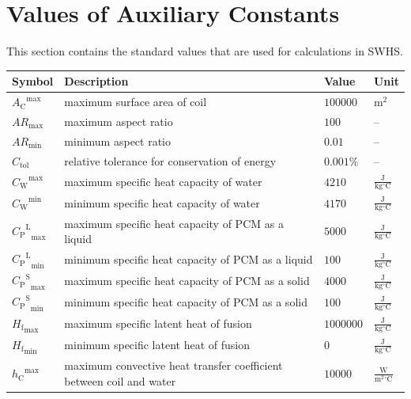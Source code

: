 \documentclass[12pt]{article}
\begin{document}
\section{Values of Auxiliary Constants}
\label{Sec:AuxConstants}
This section contains the standard values that are used for calculations in SWHS.

\begin{longtabu}{l X[l] l l}
\toprule
\textbf{Symbol} & \textbf{Description} & \textbf{Value} & \textbf{Unit}
\\
\midrule
\endhead
${{A_{\text{C}}}^{\text{max}}}$ & maximum surface area of coil & $100000$ & ${\text{m}^{2}}$
\\
${AR_{\text{max}}}$ & maximum aspect ratio & $100$ & --
\\
${AR_{\text{min}}}$ & minimum aspect ratio & $0.01$ & --
\\
${C_{\text{tol}}}$ & relative tolerance for conservation of energy & $0.001\%$ & --
\\
${{C_{\text{W}}}^{\text{max}}}$ & maximum specific heat capacity of water & $4210$ & $\frac{\text{J}}{\text{kg}{}^{\circ}\text{C}}$
\\
${{C_{\text{W}}}^{\text{min}}}$ & minimum specific heat capacity of water & $4170$ & $\frac{\text{J}}{\text{kg}{}^{\circ}\text{C}}$
\\
${{{C_{\text{P}}}^{\text{L}}}_{\text{max}}}$ & maximum specific heat capacity of PCM as a liquid & $5000$ & $\frac{\text{J}}{\text{kg}{}^{\circ}\text{C}}$
\\
${{{C_{\text{P}}}^{\text{L}}}_{\text{min}}}$ & minimum specific heat capacity of PCM as a liquid & $100$ & $\frac{\text{J}}{\text{kg}{}^{\circ}\text{C}}$
\\
${{{C_{\text{P}}}^{\text{S}}}_{\text{max}}}$ & maximum specific heat capacity of PCM as a solid & $4000$ & $\frac{\text{J}}{\text{kg}{}^{\circ}\text{C}}$
\\
${{{C_{\text{P}}}^{\text{S}}}_{\text{min}}}$ & minimum specific heat capacity of PCM as a solid & $100$ & $\frac{\text{J}}{\text{kg}{}^{\circ}\text{C}}$
\\
${{H_{\text{f}}}_{\text{max}}}$ & maximum specific latent heat of fusion & $1000000$ & $\frac{\text{J}}{\text{kg}{}^{\circ}\text{C}}$
\\
${{H_{\text{f}}}_{\text{min}}}$ & minimum specific latent heat of fusion & $0$ & $\frac{\text{J}}{\text{kg}{}^{\circ}\text{C}}$
\\
${{h_{\text{C}}}^{\text{max}}}$ & maximum convective heat transfer coefficient between coil and water & $10000$ & $\frac{\text{W}}{\text{m}^{2}{}^{\circ}\text{C}}$

\end{longtabu}
\end{document}
